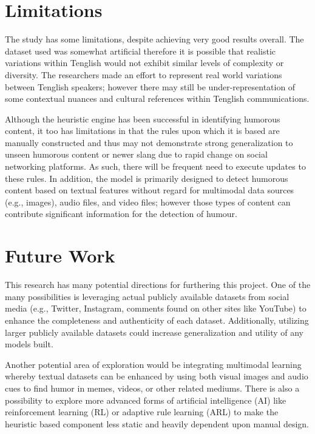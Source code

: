 \documentclass[conference]{IEEEtran}
\begin{document}
\section{Limitations}

The study has some limitations, despite achieving very good results overall. The dataset used was somewhat artificial therefore it is possible that realistic variations within Tenglish would not exhibit similar levels of complexity or diversity. The researchers made an effort to represent real world variations between Tenglish speakers; however there may still be under-representation of some contextual nuances and cultural references within Tenglish communications.

Although the heuristic engine has been successful in identifying humorous content, it too has limitations in that the rules upon which it is based are manually constructed and thus may not demonstrate strong generalization to unseen humorous content or newer slang due to rapid change on social networking platforms. As such, there will be frequent need to execute updates to these rules. In addition, the model is primarily designed to detect humorous content based on textual features without regard for multimodal data sources (e.g., images), audio files, and video files; however those types of content can contribute significant information for the detection of humour.

\section{Future Work}

This research has many potential directions for furthering this project. One of the many possibilities is leveraging actual publicly available datasets from social media (e.g., Twitter, Instagram, comments found on other sites like YouTube) to enhance the completeness and authenticity of each dataset. Additionally, utilizing larger publicly available datasets could increase generalization and utility of any models built.

Another potential area of exploration would be integrating multimodal learning whereby textual datasets can be enhanced by using both visual images and audio cues to find humor in memes, videos, or other related mediums. There is also a possibility to explore more advanced forms of artificial intelligence (AI) like reinforcement learning (RL) or adaptive rule learning (ARL) to make the heuristic based component less static and heavily dependent upon manual design.
\end{document}
